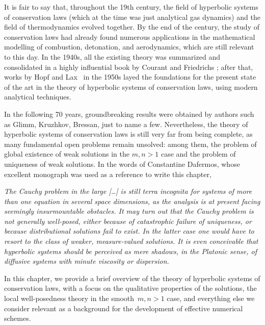 It is fair to say that, throughout the 19th century, the field
of hyperbolic systems of conservation laws (which at the time was just
analytical gas dynamics) and the field of thermodynamics evolved together.
By the end of the century, the study of conservation laws
had already found numerous applications in the mathematical modelling
of combustion, detonation, and aerodynamics, which are still
relevant to this day.
In the 1940s, all the existing theory was summarized and consolidated
in a highly influential book by Courant and Friedrichs
\cite{courant-friedrichs}; after that, works by Hopf and Lax~\cite{hopf,lax}
in the 1950s layed the foundations for the present state of the art
in the theory of hyperbolic systems of conservation laws,
using modern analytical techniques.

In the following 70 years, groundbreaking results were obtained
by authors such as Glimm, Kruzhkov, Bressan, just to name a few.
Nevertheless, the theory of hyperbolic systems of conservation laws is still
very far from being complete, as many fundamental open problems remain
unsolved: among them, the problem of global existence of weak
solutions in the $m,n > 1$ case and the problem of uniqueness of weak solutions.
In the words of Constantine Dafermos, whose excellent monograph \cite{dafermos}
was used as a reference to write this chapter,
\begin{displayquote}
\textit{The Cauchy problem in the large [\dots]
is still terra incognita for systems of more
than one equation in several space dimensions, as the analysis is at
present facing seemingly insurmountable obstacles. It may turn out that
the Cauchy problem is not generally well-posed, either because of
catastrophic failure of uniqueness, or because distributional solutions
fail to exist. In the latter case one would have to resort to the class
of weaker, measure-valued solutions. It is even conceivable that
hyperbolic systems should be perceived as mere shadows, in the Platonic sense,
of diffusive systems with minute viscosity or dispersion.}
\end{displayquote}
In this chapter, we provide a brief overview of the theory of hyperbolic
systems of conservation laws, with a focus on the qualitative properties
of the solutions, the local well-posedness theory in the smooth~$m,n > 1$ case,
and everything else we consider relevant as a background for the development
of effective numerical schemes.

